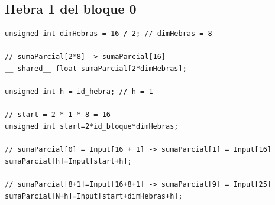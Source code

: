 \documentclass[11pt,a4paper]{article}
\begin{document}
\subsection{Hebra 1 del bloque 0}

\begin{lstlisting}
unsigned int dimHebras = 16 / 2; // dimHebras = 8

// sumaParcial[2*8] -> sumaParcial[16]
__ shared__ float sumaParcial[2*dimHebras];

unsigned int h = id_hebra; // h = 1

// start = 2 * 1 * 8 = 16
unsigned int start=2*id_bloque*dimHebras;

// sumaParcial[0] = Input[16 + 1] -> sumaParcial[1] = Input[16]
sumaParcial[h]=Input[start+h];

// sumaParcial[8+1]=Input[16+8+1] -> sumaParcial[9] = Input[25]
sumaParcial[N+h]=Input[start+dimHebras+h];
\end{lstlisting}
\end{document}
